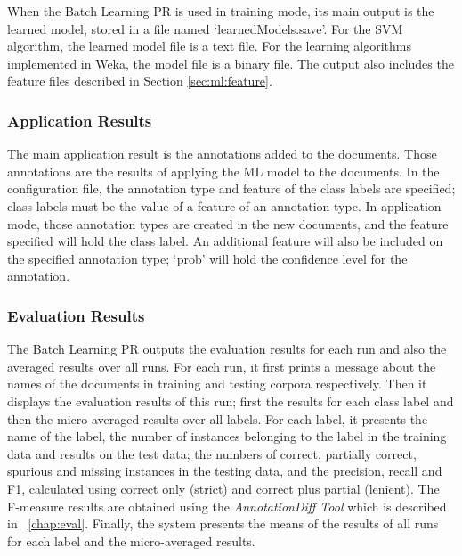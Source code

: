 When the Batch Learning PR is used in training mode, its main output is the
learned model, stored in a file named `learnedModels.save'.  For the SVM
algorithm, the learned model file is a text file. For the learning algorithms
implemented in Weka, the model file is a binary file. The output also includes
the feature files described in Section \ref{sec:ml:feature}.

\subsubsection{Application Results}

The main application result is the annotations added to the documents.  Those
annotations are the results of applying the ML model to the documents. In the
configuration file, the annotation type and feature of the class labels are
specified; class labels must be the value of a feature of an annotation type.
In application mode, those annotation types are created in the new
documents, and the feature specified will hold the class label. An additional
feature will also be included on the specified annotation type; `prob' will
hold the confidence level for the annotation.

\subsubsection{Evaluation Results}

The Batch Learning PR outputs the evaluation results for each run and also the
averaged results over all runs. For each run, it first prints a message about the
names of the documents in training and testing corpora respectively. Then it
displays the evaluation results of this run; first the results for each class
label and then the micro-averaged results over all labels. For each label, it
presents the name of the label, the number of instances belonging to the label in
the training data and results on the test data; the numbers of correct, partially
correct, spurious and missing instances in the testing data, and the precision,
recall and F1, calculated using correct only (strict) and correct plus partial
(lenient). The F-measure results are obtained using the {\em AnnotationDiff Tool}
which is described in \Chapthing\ \ref{chap:eval}. Finally, the system presents
the means of the results of all runs for each label and the micro-averaged
results.



